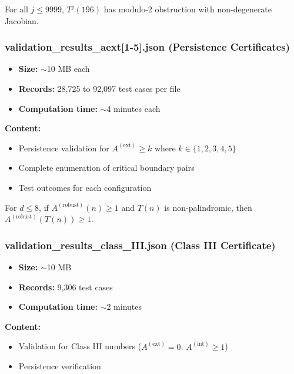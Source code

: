 \documentclass[11pt,a4paper]{article}
\theoremstyle{definition}
\begin{document}
\begin{criticalbox}[title={Key Claim}]
For all $j \leq 9999$, $T^j(196)$ has modulo-2 obstruction with non-degenerate Jacobian.
\end{criticalbox}

\subsubsection{validation\_results\_aext[1-5].json (Persistence Certificates)}

\begin{itemize}[leftmargin=*]
    \item \textbf{Size:} $\sim$10 MB each
    \item \textbf{Records:} 28,725 to 92,097 test cases per file
    \item \textbf{Computation time:} $\sim$4 minutes each
\end{itemize}

\textbf{Content:}
\begin{itemize}
    \item Persistence validation for $A^{(\text{ext})} \geq k$ where $k \in \{1, 2, 3, 4, 5\}$
    \item Complete enumeration of critical boundary pairs
    \item Test outcomes for each configuration
\end{itemize}

\begin{criticalbox}[title={Key Claim}]
For $d \leq 8$, if $A^{(\text{robust})}(n) \geq 1$ and $T(n)$ is non-palindromic, then $A^{(\text{robust})}(T(n)) \geq 1$.
\end{criticalbox}

\subsubsection{validation\_results\_class\_III.json (Class III Certificate)}

\begin{itemize}[leftmargin=*]
    \item \textbf{Size:} $\sim$10 MB
    \item \textbf{Records:} 9,306 test cases
    \item \textbf{Computation time:} $\sim$2 minutes
\end{itemize}

\textbf{Content:}
\begin{itemize}
    \item Validation for Class III numbers ($A^{(\text{ext})} = 0$, $A^{(\text{int})} \geq 1$)
    \item Persistence verification
\end{itemize}
\end{document}

